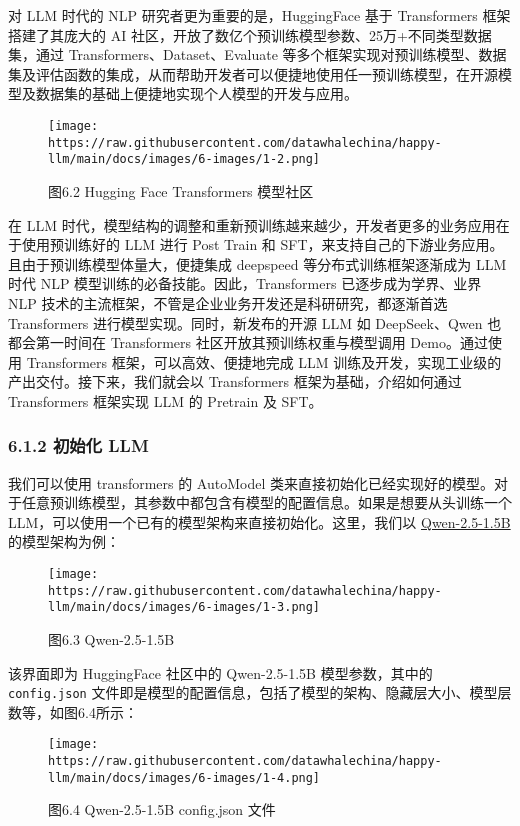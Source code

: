 \documentclass[
]{article}
\begin{document}
对 LLM 时代的 NLP 研究者更为重要的是，HuggingFace 基于 Transformers
框架搭建了其庞大的 AI
社区，开放了数亿个预训练模型参数、25万+不同类型数据集，通过
Transformers、Dataset、Evaluate
等多个框架实现对预训练模型、数据集及评估函数的集成，从而帮助开发者可以便捷地使用任一预训练模型，在开源模型及数据集的基础上便捷地实现个人模型的开发与应用。

\begin{figure}[htbp]\centering
\texttt{[image: https://raw.githubusercontent.com/datawhalechina/happy-llm/main/docs/images/6-images/1-2.png]}
\caption{图6.2 Hugging Face Transformers 模型社区}
\end{figure}

在 LLM
时代，模型结构的调整和重新预训练越来越少，开发者更多的业务应用在于使用预训练好的
LLM 进行 Post Train 和
SFT，来支持自己的下游业务应用。且由于预训练模型体量大，便捷集成
deepspeed 等分布式训练框架逐渐成为 LLM 时代 NLP
模型训练的必备技能。因此，Transformers 已逐步成为学界、业界 NLP
技术的主流框架，不管是企业业务开发还是科研研究，都逐渐首选 Transformers
进行模型实现。同时，新发布的开源 LLM 如 DeepSeek、Qwen 也都会第一时间在
Transformers 社区开放其预训练权重与模型调用 Demo。通过使用 Transformers
框架，可以高效、便捷地完成 LLM
训练及开发，实现工业级的产出交付。接下来，我们就会以 Transformers
框架为基础，介绍如何通过 Transformers 框架实现 LLM 的 Pretrain 及 SFT。

\subsubsection{6.1.2 初始化 LLM}\label{ux521dux59cbux5316-llm}

我们可以使用 transformers 的 AutoModel
类来直接初始化已经实现好的模型。对于任意预训练模型，其参数中都包含有模型的配置信息。如果是想要从头训练一个
LLM，可以使用一个已有的模型架构来直接初始化。这里，我们以
\href{https://huggingface.co/Qwen/Qwen2.5-1.5B/tree/main}{Qwen-2.5-1.5B}的模型架构为例：

\begin{figure}[htbp]\centering
\texttt{[image: https://raw.githubusercontent.com/datawhalechina/happy-llm/main/docs/images/6-images/1-3.png]}
\caption{图6.3 Qwen-2.5-1.5B}
\end{figure}

该界面即为 HuggingFace 社区中的 Qwen-2.5-1.5B 模型参数，其中的
\texttt{config.json}
文件即是模型的配置信息，包括了模型的架构、隐藏层大小、模型层数等，如图6.4所示：

\begin{figure}[htbp]\centering
\texttt{[image: https://raw.githubusercontent.com/datawhalechina/happy-llm/main/docs/images/6-images/1-4.png]}
\caption{图6.4 Qwen-2.5-1.5B config.json 文件}
\end{figure}
\end{document}
